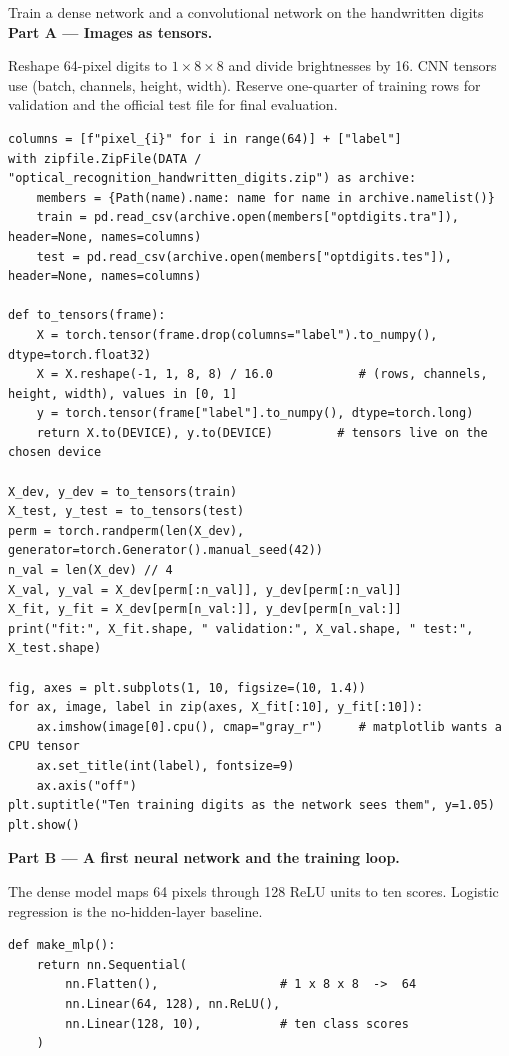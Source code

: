\begin{labproject}{Train a dense network and a convolutional network on the handwritten digits}
\medskip\noindent\textbf{Part A --- Images as tensors.}\par

Reshape 64-pixel digits to $1\times8\times8$ and divide brightnesses by 16. CNN tensors use (batch, channels, height, width). Reserve one-quarter of training rows for validation and the official test file for final evaluation.

\begin{lstlisting}[style=utppython]
columns = [f"pixel_{i}" for i in range(64)] + ["label"]
with zipfile.ZipFile(DATA / "optical_recognition_handwritten_digits.zip") as archive:
    members = {Path(name).name: name for name in archive.namelist()}
    train = pd.read_csv(archive.open(members["optdigits.tra"]), header=None, names=columns)
    test = pd.read_csv(archive.open(members["optdigits.tes"]), header=None, names=columns)

def to_tensors(frame):
    X = torch.tensor(frame.drop(columns="label").to_numpy(), dtype=torch.float32)
    X = X.reshape(-1, 1, 8, 8) / 16.0            # (rows, channels, height, width), values in [0, 1]
    y = torch.tensor(frame["label"].to_numpy(), dtype=torch.long)
    return X.to(DEVICE), y.to(DEVICE)         # tensors live on the chosen device

X_dev, y_dev = to_tensors(train)
X_test, y_test = to_tensors(test)
perm = torch.randperm(len(X_dev), generator=torch.Generator().manual_seed(42))
n_val = len(X_dev) // 4
X_val, y_val = X_dev[perm[:n_val]], y_dev[perm[:n_val]]
X_fit, y_fit = X_dev[perm[n_val:]], y_dev[perm[n_val:]]
print("fit:", X_fit.shape, " validation:", X_val.shape, " test:", X_test.shape)

fig, axes = plt.subplots(1, 10, figsize=(10, 1.4))
for ax, image, label in zip(axes, X_fit[:10], y_fit[:10]):
    ax.imshow(image[0].cpu(), cmap="gray_r")     # matplotlib wants a CPU tensor
    ax.set_title(int(label), fontsize=9)
    ax.axis("off")
plt.suptitle("Ten training digits as the network sees them", y=1.05)
plt.show()
\end{lstlisting}

\medskip\noindent\textbf{Part B --- A first neural network and the training loop.}\par

The dense model maps 64 pixels through 128 ReLU units to ten scores. Logistic regression is the no-hidden-layer baseline.

\begin{lstlisting}[style=utppython]
def make_mlp():
    return nn.Sequential(
        nn.Flatten(),                 # 1 x 8 x 8  ->  64
        nn.Linear(64, 128), nn.ReLU(),
        nn.Linear(128, 10),           # ten class scores
    )


\end{lstlisting}
\end{labproject}
